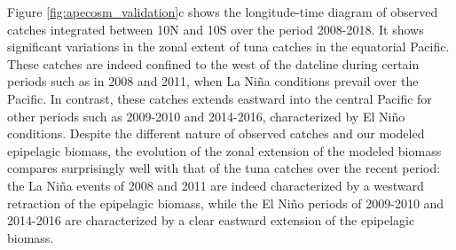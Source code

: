 Figure \ref{fig:apecosm_validation}c shows the longitude-time diagram of observed catches integrated between 10N and 10S over the period 2008-2018. It shows significant variations in the zonal extent of tuna catches in the equatorial Pacific. These catches are indeed confined to the west of the dateline during certain periods such as in 2008 and 2011, when La Niña conditions prevail over the Pacific. In contrast, these catches extends eastward into the central Pacific for other periods such as 2009-2010 and 2014-2016, characterized by El Niño conditions. Despite the different nature of observed catches and our modeled epipelagic biomass, the evolution of the zonal extension of the modeled biomass compares surprisingly well with that of the tuna catches over the recent period: the La Niña events of 2008 and 2011 are indeed characterized by a westward retraction of the epipelagic biomass, while the El Niño periods of 2009-2010 and 2014-2016 are characterized by a clear eastward extension of the epipelagic biomass. 

